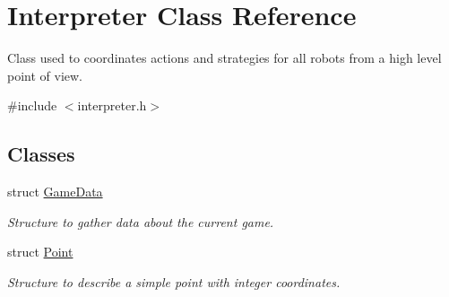\hypertarget{classInterpreter}{
\section{Interpreter Class Reference}
\label{classInterpreter}
}


Class used to coordinates actions and strategies for all robots from a high level point of view.  




{\ttfamily \#include $<$interpreter.h$>$}

\subsection*{Classes}
\begin{DoxyCompactItemize}
\item 
struct \hyperlink{structInterpreter_1_1GameData}{GameData}
\begin{DoxyCompactList}\small\item\em Structure to gather data about the current game. \item\end{DoxyCompactList}\item 
struct \hyperlink{structInterpreter_1_1Point}{Point}
\begin{DoxyCompactList}\small\item\em Structure to describe a simple point with integer coordinates. \item\end{DoxyCompactList}\end{DoxyCompactItemize}
